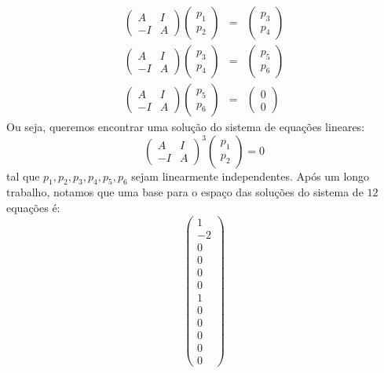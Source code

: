 \documentclass[11pt,a4paper]{article}
\begin{document}
{\[
\begin{array}{rcl}
\begin{pmatrix}
A&I\\-I&A
\end{pmatrix}\begin{pmatrix}
p_1\\p_2
\end{pmatrix}&=&\begin{pmatrix}
p_3\\p_4
\end{pmatrix}\\
\begin{pmatrix}
A&I\\-I&A
\end{pmatrix}\begin{pmatrix}
p_3\\p_4
\end{pmatrix}&=&\begin{pmatrix}
p_5\\p_6
\end{pmatrix}\\
\begin{pmatrix}
A&I\\-I&A
\end{pmatrix}\begin{pmatrix}
p_5\\p_6
\end{pmatrix}&=&\begin{pmatrix}
0\\0
\end{pmatrix}
\end{array}
\]
Ou seja, queremos encontrar uma solução do sistema de equações lineares:
\[
\begin{pmatrix}
A&I\\-I&A
\end{pmatrix}^3
\begin{pmatrix}
p_1\\p_2
\end{pmatrix}
=0
\]
tal que $p_1,p_2,p_3,p_4,p_5,p_6$ sejam linearmente independentes. Após um longo trabalho, notamos que uma base para o espaço das soluções do sistema de $12$ equações é:
\[
\begin{pmatrix}
1\\-2\\0\\0\\0\\0\\1\\0\\0\\0\\0\\0

\end{pmatrix}\]}
\end{document}
